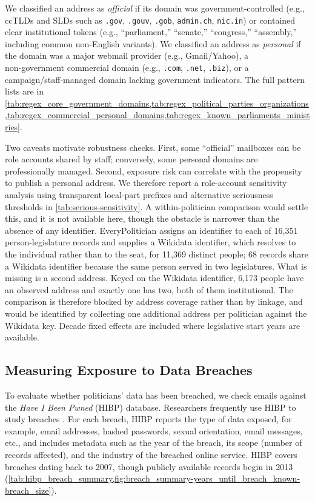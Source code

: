 \documentclass[12pt, letterpaper]{article}
\begin{document}
We classified an address as \emph{official} if its domain was government‑controlled (e.g., ccTLDs and SLDs such as \texttt{.gov}, \texttt{.gouv}, \texttt{.gob}, \texttt{admin.ch}, \texttt{nic.in}) or contained clear institutional tokens (e.g., ``parliament,'' ``senate,'' ``congress,'' ``assembly,'' including common non‑English variants). We classified an address as \emph{personal} if the domain was a major webmail provider (e.g., Gmail/Yahoo), a non‑government commercial domain (e.g., \texttt{.com}, \texttt{.net}, \texttt{.biz}), or a campaign/staff‑managed domain lacking government indicators. The full pattern lists are in \cref{tab:regex_core_government_domains,tab:regex_political_parties_organizations,tab:regex_commercial_personal_domains,tab:regex_known_parliaments_ministries}.

Two caveats motivate robustness checks. First, some ``official'' mailboxes can be role accounts shared by staff; conversely, some personal domains are professionally managed. Second, exposure risk can correlate with the propensity to publish a personal address. We therefore report a role-account sensitivity analysis using transparent local-part prefixes and alternative seriousness thresholds in \cref{tab:serious-sensitivity}. A within-politician comparison would settle this, and it is not available here, though the obstacle is narrower than the absence of any identifier. EveryPolitician assigns an identifier to each of 16,351 person-legislature records and supplies a Wikidata identifier, which resolves to the individual rather than to the seat, for 11,369 distinct people; 68 records share a Wikidata identifier because the same person served in two legislatures. What is missing is a second address. Keyed on the Wikidata identifier, 6,173 people have an observed address and exactly one has two, both of them institutional. The comparison is therefore blocked by address coverage rather than by linkage, and would be identified by collecting one additional address per politician against the Wikidata key. Decade fixed effects are included where legislative start years are available.

\subsection{Measuring Exposure to Data Breaches}\label{sec:hibp-data}
To evaluate whether politicians' data has been breached, we check emails against the \textit{Have I Been Pwned} (HIBP) database. Researchers frequently use HIBP to study breaches \citep[see, for, e.g.,][]{hien2024discovering, sood2019pwned, Sood_Have_I_Been_2023}. For each breach, HIBP reports the type of data exposed, for example, email addresses, hashed passwords, sexual orientation, email messages, etc., and includes metadata such as the year of the breach, its scope (number of records affected), and the industry of the breached online service. HIBP covers breaches dating back to 2007, though publicly available records begin in 2013 (\cref{tab:hibp_breach_summary,fig:breach_summary-years_until_breach_known-breach_size}).
\end{document}
